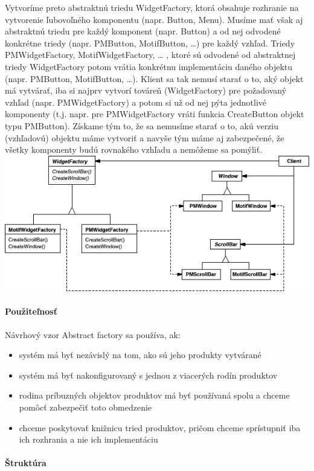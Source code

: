 		Vytvoríme preto abstraktnú triedu WidgetFactory, ktorá obsahuje rozhranie na vytvorenie ľubovoľného komponentu (napr. Button, Menu). Musíme mať však aj abstraktnú triedu pre každý komponent (napr. Button) a od nej odvodené konkrétne triedy (napr. PMButton, MotifButton, …) pre každý vzhľad. Triedy PMWidgetFactory, MotifWidgetFactory, … , ktoré sú odvodené od abstraktnej triedy WidgetFactory potom vrátia konkrétnu implementáciu daného objektu (napr. PMButton, MotifButton, …). Klient sa tak nemusí starať o to, aký objekt má vytvárať, iba si najprv vytvorí továreň (WidgetFactory) pre požadovaný vzhľad (napr. PMWidgetFactory) a potom si už od nej pýta jednotlivé komponenty (t.j. napr. pre PMWidgetFactory vráti funkcia CreateButton objekt typu PMButton). Získame tým to, že sa nemusíme starať o to, akú verziu (vzhľadovú) objektu máme vytvoriť a navyše tým máme aj zabezpečené, že všetky komponenty budú rovnakého vzhľadu a nemôžeme sa pomýliť.\\

		\includegraphics[width=.9\textwidth]{images/abstractfactory1}

		\paragraph{Použiteľnosť}
		Návrhový vzor Abstract factory sa používa, ak:
			\begin{itemize}
				\item systém má byť nezávislý na tom, ako sú jeho produkty vytvárané
				\item systém má byť nakonfigurovaný s jednou z viacerých rodín produktov
				\item rodina príbuzných objektov produktov má byť používaná spolu a chceme pomôcť zabezpečiť toto obmedzenie
				\item chceme poskytovať knižnicu tried produktov, pričom chceme sprístupniť iba ich rozhrania a nie ich implementáciu
			\end{itemize}
		\paragraph{Štruktúra}

